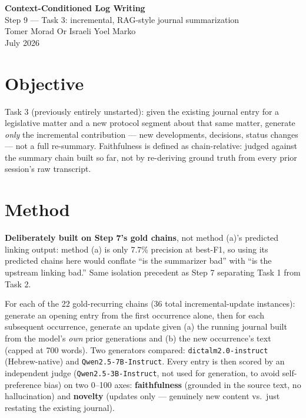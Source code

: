 \documentclass[11pt,a4paper]{article}
\begin{document}
\begin{center}
  {\LARGE \textbf{Context-Conditioned Log Writing}}\\[0.3em]
  {\large Step 9 --- Task 3: incremental, RAG-style journal summarization}\\[0.6em]
  {\normalsize Tomer Morad \quad Or Israeli \quad Yoel Marko}\\
  {\normalsize July 2026}
\end{center}

\vspace{0.5em}

\section{Objective}

Task 3 (previously entirely unstarted): given the existing journal entry for a legislative
matter and a new protocol segment about that same matter, generate \emph{only} the incremental
contribution --- new developments, decisions, status changes --- not a full re-summary.
Faithfulness is defined as chain-relative: judged against the summary chain built so far, not
by re-deriving ground truth from every prior session's raw transcript.

\section{Method}

\textbf{Deliberately built on Step 7's gold chains}, not method (a)'s predicted linking output:
method (a) is only 7.7\% precision at best-F1, so using its predicted chains here would conflate
``is the summarizer bad'' with ``is the upstream linking bad.'' Same isolation precedent as
Step 7 separating Task 1 from Task 2.

For each of the 22 gold-recurring chains (36 total incremental-update instances): generate an
opening entry from the first occurrence alone, then for each subsequent occurrence, generate an
update given (a) the running journal built from the model's \emph{own} prior generations and
(b) the new occurrence's text (capped at 700 words). Two generators compared:
\texttt{dictalm2.0-instruct} (Hebrew-native) and \texttt{Qwen2.5-7B-Instruct}. Every entry is
then scored by an independent judge (\texttt{Qwen2.5-3B-Instruct}, not used for generation, to
avoid self-preference bias) on two 0--100 axes: \textbf{faithfulness} (grounded in the source
text, no hallucination) and \textbf{novelty} (updates only --- genuinely new content vs.\ just
restating the existing journal).
\end{document}
